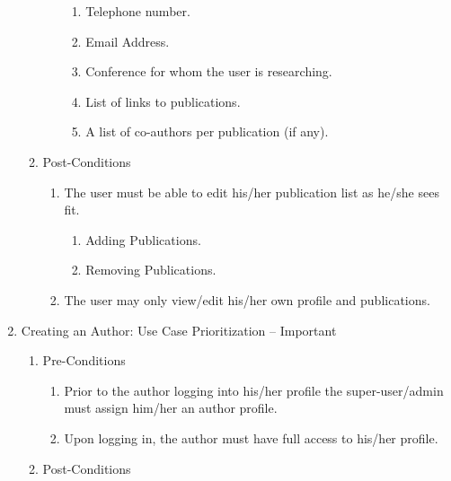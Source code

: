 \documentclass[hidelinks,a4paper,12pt]{article}
\begin{document}
\begin{enumerate}
\begin{enumerate}
\begin{enumerate}
\begin{enumerate}
					\item  Telephone number.
					
					\item  Email Address.
					
					\item  Conference for whom the user is researching.
					
					\item  List of links to publications.
					
					\item  A list of co-authors per publication (if any).
				\end{enumerate}
			\end{enumerate}
			
			\item  Post-Conditions
			
			\begin{enumerate}
				\item  The user must be able to edit his/her publication list as he/she sees fit.
				
				\begin{enumerate}
					\item  Adding Publications.
					
					\item  Removing Publications.
				\end{enumerate}
				
				\item  The user may only view/edit his/her own profile and publications.
			\end{enumerate}
		\end{enumerate}
		\noindent 
		
		\item  Creating an Author: Use Case Prioritization -- Important
		
		\begin{enumerate}
			\item  Pre-Conditions
			
			\begin{enumerate}
				\item  Prior to the author logging into his/her profile the super-user/admin must assign him/her an author profile.
				
				\item  Upon logging in, the author must have full access to his/her profile.
			\end{enumerate}
			
			\item  Post-Conditions
			

\end{enumerate}
\end{enumerate}
\end{document}
